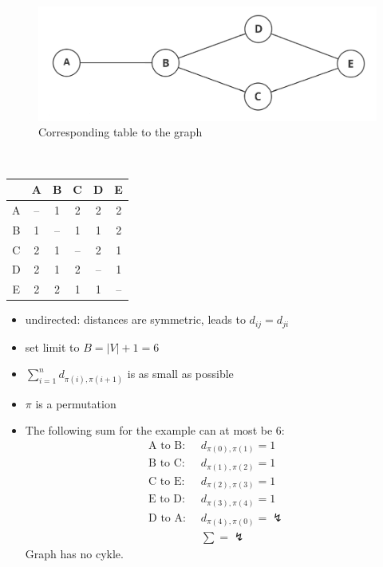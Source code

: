 \documentclass[a4]{scrartcl}
\let\stmaryrdLightning\lightning
\begin{document}
\begin{minipage}{0.7\textwidth}
\begin{figure}[H]
\begin{center}
\includegraphics[scale=0.18]{tsp_1.png}
\end{center}
\caption{Corresponding table to the graph}
\end{figure}

\end{minipage}\begin{minipage}{0.05\textwidth}
\ \\
\end{minipage}\begin{minipage}{0.25\textwidth}
\begin{tabular}{c|c|c|c|c|c|}
 & A & B & C & D & E \\
\hline
A & -- & 1 & 2 & 2 & 2 \\
\hline
B & 1 & -- & 1 & 1 & 2 \\
\hline
C & 2 & 1 & -- & 2 & 1 \\
\hline
D & 2 & 1 & 2 & -- & 1 \\
\hline
E & 2 & 2 & 1 & 1 & -- \\
\hline
\end{tabular}


\end{minipage}

\begin{itemize}
\item undirected: distances are symmetric, leads to $d_{ij} = d_{ji}$
\item set limit to $B = |V|+1 = 6$
\item $\sum^{n}_{i=1} d_{\pi(i), \pi(i+1)}$ is as small as possible
\item $\pi$ is a permutation
\item[] The following sum for the example can at most be 6:
\begin{align*}
 \text{A to B: } & \  d_{\pi(0), \pi(1)} =  1 \\
  \text{B to C: } & \  d_{\pi(1), \pi(2)} = 1\\
   \text{C to E: } & \  d_{\pi(2), \pi(3)} = 1 \\
 \text{E to D: } & \  d_{\pi(3), \pi(4)} =  1\\
 \text{D to A: } & \  d_{\pi(4), \pi(0)} = \stmaryrdLightning
 \\
 & \ \sum = \stmaryrdLightning
\end{align*}
Graph has no cykle.
\end{itemize}
\end{document}
